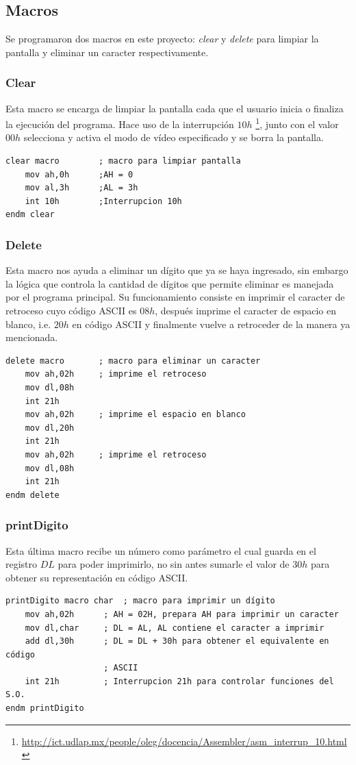 \documentclass[letter,12 pt,titlepage]{article}
\begin{document}
    \subsection{Macros}

    Se programaron dos macros en este proyecto: \textit{clear} y \textit{delete} para limpiar la pantalla y eliminar un caracter respectivamente.

    \subsubsection{Clear}
    Esta macro se encarga de limpiar la pantalla cada que el usuario inicia o finaliza la ejecución del programa.
    Hace uso de la interrupción $10h$ \footnote{\url{http://ict.udlap.mx/people/oleg/docencia/Assembler/asm_interrup_10.html}}, junto con el valor $00h$ selecciona y activa el modo de vídeo especificado y se borra la pantalla.

    \begin{verbatim}
clear macro        ; macro para limpiar pantalla
    mov ah,0h      ;AH = 0
    mov al,3h      ;AL = 3h
    int 10h        ;Interrupcion 10h
endm clear
    \end{verbatim}

    \subsubsection{Delete}
    Esta macro nos ayuda a eliminar un dígito que ya se haya ingresado, sin embargo la lógica que controla la cantidad de dígitos que permite eliminar es manejada por el programa principal. 
    Su funcionamiento consiste en imprimir el caracter de retroceso cuyo código ASCII es $08h$, después imprime el caracter de espacio en blanco, i.e. $20h$ en código ASCII y finalmente vuelve a retroceder de la manera ya mencionada.
    \begin{verbatim}
delete macro       ; macro para eliminar un caracter
    mov ah,02h     ; imprime el retroceso
    mov dl,08h
    int 21h
    mov ah,02h     ; imprime el espacio en blanco
    mov dl,20h
    int 21h
    mov ah,02h     ; imprime el retroceso
    mov dl,08h
    int 21h
endm delete
    \end{verbatim}

    \subsubsection{printDigito}
    Esta última macro recibe un número como parámetro el cual guarda en el registro $DL$ para poder imprimirlo, no sin antes sumarle el valor de $30h$ para obtener su representación en código ASCII.
    \begin{verbatim}
printDigito macro char  ; macro para imprimir un dígito
    mov ah,02h      ; AH = 02H, prepara AH para imprimir un caracter
    mov dl,char     ; DL = AL, AL contiene el caracter a imprimir
    add dl,30h      ; DL = DL + 30h para obtener el equivalente en código 
                    ; ASCII
    int 21h         ; Interrupcion 21h para controlar funciones del S.O.
endm printDigito
    \end{verbatim}
\end{document}
